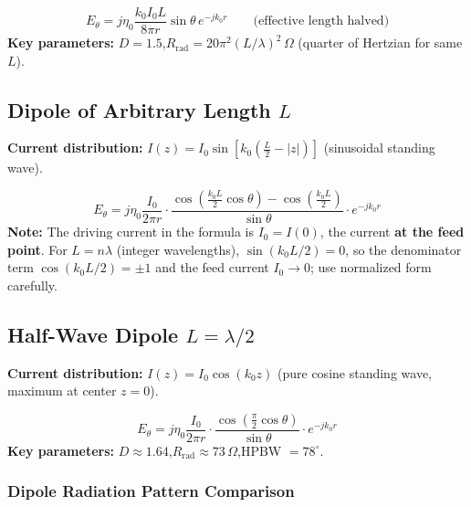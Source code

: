 \documentclass[10pt,letterpaper]{article}
\newcommand{\degrees}{^{\circ}}
\begin{document}
\begin{equation}
  E_\theta = j\eta_0\frac{k_0 I_0 L}{8\pi r}\sin\theta\,e^{-jk_0 r} \qquad \text{(effective length halved)}
\end{equation}
\textbf{Key parameters:} $D = 1.5$,\quad $R_\mathrm{rad} = 20\pi^2(L/\lambda)^2\,\Omega$ (quarter of Hertzian for same $L$).

\subsection{Dipole of Arbitrary Length $L$}

\textbf{Current distribution:} $I(z) = I_0\sin\!\left[k_0\!\left(\frac{L}{2}-|z|\right)\right]$ (sinusoidal standing wave).

\begin{tcolorbox}[formulabox, title={Far-Field: Arbitrary-Length Dipole}]
\begin{equation}
  E_\theta = j\eta_0\frac{I_0}{2\pi r}\cdot\frac{\cos\!\left(\frac{k_0 L}{2}\cos\theta\right) - \cos\!\left(\frac{k_0 L}{2}\right)}{\sin\theta}\cdot e^{-jk_0 r}
\end{equation}
\textbf{Note:} The driving current in the formula is $I_0 = I(0)$, the current \textbf{at the feed point}. For $L = n\lambda$ (integer wavelengths), $\sin(k_0 L/2) = 0$, so the denominator term $\cos(k_0 L/2) = \pm 1$ and the feed current $I_0\to 0$; use normalized form carefully.
\end{tcolorbox}

\subsection{Half-Wave Dipole $L = \lambda/2$}

\textbf{Current distribution:} $I(z) = I_0\cos(k_0 z)$ (pure cosine standing wave, maximum at center $z=0$).

\begin{equation}
  E_\theta = j\eta_0\frac{I_0}{2\pi r}\cdot\frac{\cos\!\left(\frac{\pi}{2}\cos\theta\right)}{\sin\theta}\cdot e^{-jk_0 r}
\end{equation}
\textbf{Key parameters:} $D \approx 1.64$,\quad $R_\mathrm{rad} \approx 73\,\Omega$,\quad HPBW $= 78\degrees$.

\subsubsection{Dipole Radiation Pattern Comparison}
\end{document}
